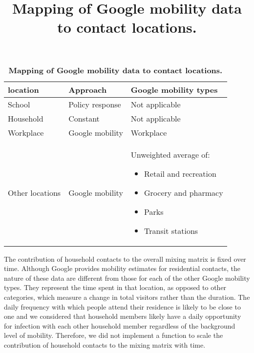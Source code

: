 \begin{table}[ht]
\renewcommand{\baselinestretch}{1}
    \begin{tabular}{| p{4.4cm} | p{4.4cm} | p{5cm} |}
        \hline
        \textbf{location} & \textbf{Approach} & \textbf{Google mobility types} \\
        \hline
        School & Policy response & Not applicable \\
      \hline
      Household & Constant & Not applicable \\
      \hline
      Workplace & Google mobility & Workplace \\
      \hline
      Other locations & Google mobility & 
      Unweighted average of: \begin{itemize}
			\item Retail and recreation
          \item Grocery and pharmacy
          \item Parks
          \item Transit stations
      \end{itemize}\\
      \hline
    \end{tabular}
    \title{Mapping of Google mobility data to contact locations.}
    \caption{\textbf{Mapping of Google mobility data to contact locations.}}
    \label{tab:mobility_map}
\end{table}

The contribution of household contacts to the overall mixing matrix is fixed over time. Although Google provides mobility 
estimates for residential contacts, the nature of these data are different from those for each of the other Google mobility 
types. They represent the time spent in that location, as opposed to other categories, which measure a change in total visitors 
rather than the duration. The daily frequency with which people attend their residence is likely to be close to one and we 
considered that household members likely have a daily opportunity for infection with each other household member regardless of
the background level of mobility. Therefore, we did not implement a function to scale the contribution of household contacts 
to the mixing matrix with time.


